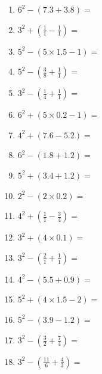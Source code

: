 \documentclass[12pt]{article}
\begin{document}
    \begin{enumerate}
\item \large $ 6^{2} - (7.3 + 3.8) = $ \vspace{1.4cm}
\item \large $ 3^{2} + (\frac{1}{1} - \frac{1}{1}) = $ \vspace{1.4cm}
\item \large $ 5^{2} - (5 \times 1.5 - 1) = $ \vspace{1.4cm}
\item \large $ 5^{2} - (\frac{3}{8} + \frac{1}{1}) = $ \vspace{1.4cm}
\item \large $ 3^{2} - (\frac{1}{4} + \frac{1}{1}) = $ \vspace{1.4cm}
\item \large $ 6^{2} + (5 \times 0.2 - 1) = $ \vspace{1.4cm}
\item \large $ 4^{2} + (7.6 - 5.2) = $ \vspace{1.4cm}
\item \large $ 6^{2} - (1.8 + 1.2) = $ \vspace{1.4cm}
\newpage
\item \large $ 5^{2} + (3.4 + 1.2) = $ \vspace{1.4cm}
\item \large $ 2^{2} - (2 \times 0.2) = $ \vspace{1.4cm}
\item \large $ 4^{2} + (\frac{1}{1} - \frac{3}{4}) = $ \vspace{1.4cm}
\item \large $ 3^{2} + (4 \times 0.1) = $ \vspace{1.4cm}
\item \large $ 3^{2} - (\frac{2}{1} + \frac{1}{1}) = $ \vspace{1.4cm}
\item \large $ 4^{2} - (5.5 + 0.9) = $ \vspace{1.4cm}
\item \large $ 5^{2} + (4 \times 1.5 - 2) = $ \vspace{1.4cm}
\item \large $ 5^{2} - (3.9 - 1.2) = $ \vspace{1.4cm}
\item \large $ 3^{2} - (\frac{3}{2} + \frac{7}{4}) = $ \vspace{1.4cm}
\item \large $ 3^{2} - (\frac{11}{6} + \frac{4}{3}) = $ \vspace{1.4cm}

\end{enumerate}
\end{document}
